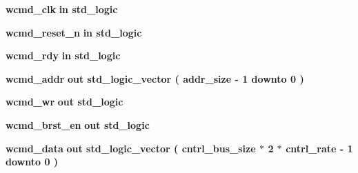 \begin{DoxyCompactItemize}
\item 
{\bf wcmd\+\_\+clk}  {\bfseries {\bfseries \textcolor{keywordflow}{in}\textcolor{vhdlchar}{ }}} {\bfseries \textcolor{comment}{std\+\_\+logic}\textcolor{vhdlchar}{ }} 
\item 
{\bf wcmd\+\_\+reset\+\_\+n}  {\bfseries {\bfseries \textcolor{keywordflow}{in}\textcolor{vhdlchar}{ }}} {\bfseries \textcolor{comment}{std\+\_\+logic}\textcolor{vhdlchar}{ }} 
\item 
{\bf wcmd\+\_\+rdy}  {\bfseries {\bfseries \textcolor{keywordflow}{in}\textcolor{vhdlchar}{ }}} {\bfseries \textcolor{comment}{std\+\_\+logic}\textcolor{vhdlchar}{ }} 
\item 
{\bf wcmd\+\_\+addr}  {\bfseries {\bfseries \textcolor{keywordflow}{out}\textcolor{vhdlchar}{ }}} {\bfseries \textcolor{comment}{std\+\_\+logic\+\_\+vector}\textcolor{vhdlchar}{ }\textcolor{vhdlchar}{(}\textcolor{vhdlchar}{ }\textcolor{vhdlchar}{ }\textcolor{vhdlchar}{ }\textcolor{vhdlchar}{ }{\bfseries {\bf addr\+\_\+size}} \textcolor{vhdlchar}{-\/}\textcolor{vhdlchar}{ } \textcolor{vhdldigit}{1} \textcolor{vhdlchar}{ }\textcolor{keywordflow}{downto}\textcolor{vhdlchar}{ }\textcolor{vhdlchar}{ } \textcolor{vhdldigit}{0} \textcolor{vhdlchar}{ }\textcolor{vhdlchar}{)}\textcolor{vhdlchar}{ }} 
\item 
{\bf wcmd\+\_\+wr}  {\bfseries {\bfseries \textcolor{keywordflow}{out}\textcolor{vhdlchar}{ }}} {\bfseries \textcolor{comment}{std\+\_\+logic}\textcolor{vhdlchar}{ }} 
\item 
{\bf wcmd\+\_\+brst\+\_\+en}  {\bfseries {\bfseries \textcolor{keywordflow}{out}\textcolor{vhdlchar}{ }}} {\bfseries \textcolor{comment}{std\+\_\+logic}\textcolor{vhdlchar}{ }} 
\item 
{\bf wcmd\+\_\+data}  {\bfseries {\bfseries \textcolor{keywordflow}{out}\textcolor{vhdlchar}{ }}} {\bfseries \textcolor{comment}{std\+\_\+logic\+\_\+vector}\textcolor{vhdlchar}{ }\textcolor{vhdlchar}{(}\textcolor{vhdlchar}{ }\textcolor{vhdlchar}{ }\textcolor{vhdlchar}{ }\textcolor{vhdlchar}{ }{\bfseries {\bf cntrl\+\_\+bus\+\_\+size}} \textcolor{vhdlchar}{$\ast$}\textcolor{vhdlchar}{ } \textcolor{vhdldigit}{2} \textcolor{vhdlchar}{$\ast$}\textcolor{vhdlchar}{ }\textcolor{vhdlchar}{ }\textcolor{vhdlchar}{ }{\bfseries {\bf cntrl\+\_\+rate}} \textcolor{vhdlchar}{-\/}\textcolor{vhdlchar}{ } \textcolor{vhdldigit}{1} \textcolor{vhdlchar}{ }\textcolor{keywordflow}{downto}\textcolor{vhdlchar}{ }\textcolor{vhdlchar}{ } \textcolor{vhdldigit}{0} \textcolor{vhdlchar}{ }\textcolor{vhdlchar}{)}\textcolor{vhdlchar}{ }} 

\end{DoxyCompactItemize}
